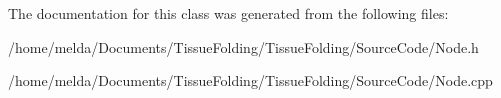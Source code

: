 The documentation for this class was generated from the following files\+:\begin{DoxyCompactItemize}
\item 
/home/melda/\+Documents/\+Tissue\+Folding/\+Tissue\+Folding/\+Source\+Code/Node.\+h\item 
/home/melda/\+Documents/\+Tissue\+Folding/\+Tissue\+Folding/\+Source\+Code/Node.\+cpp\end{DoxyCompactItemize}
